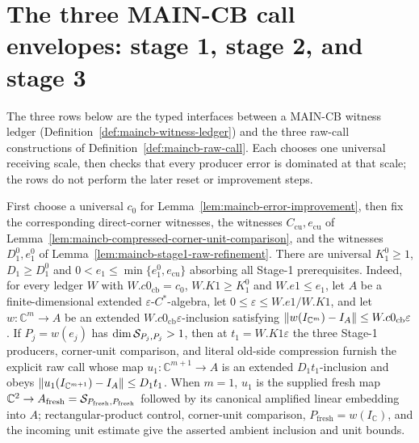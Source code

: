 \section{The three MAIN-CB call envelopes: stage 1, stage 2, and stage 3}\label{sec:maincb-call-envelopes}

The three rows below are the typed interfaces between a MAIN-CB witness ledger
(Definition~\ref{def:maincb-witness-ledger}) and the three raw-call constructions of
Definition~\ref{def:maincb-raw-call}.  Each chooses one universal receiving scale, then
checks that every producer error is dominated at that scale; the rows do not perform the
later reset or improvement steps.

\begin{lemma}\label{lem:maincb-stage1-call-envelope}
First choose a universal $c_{0}$ for Lemma~\ref{lem:maincb-error-improvement}, then fix the
corresponding direct-corner witnesses, the witnesses
$C_{\mathrm{cu}},e_{\mathrm{cu}}$ of
Lemma~\ref{lem:maincb-compressed-corner-unit-comparison}, and the witnesses
$D_{1}^{0},e_{1}^{0}$ of Lemma~\ref{lem:maincb-stage1-raw-refinement}.  There are universal
$K_{1}^{0}\ge1$, $D_{1}\ge D_{1}^{0}$ and
$0<e_{1}\le\min\{e_{1}^{0},e_{\mathrm{cu}}\}$ absorbing all Stage-1 prerequisites.
Indeed, for every ledger $W$ with $W.c0_{\mathrm{cb}}=c_{0}$, $W.K1\ge K_{1}^{0}$ and
$W.e1\le e_{1}$, let $A$ be a finite-dimensional extended
$\varepsilon$-$C^{*}$-algebra, let $0\le\varepsilon\le W.e1/W.K1$, and let
$w:\mathbb C^{m}\to A$ be an extended $W.c0_{\mathrm{cb}}\varepsilon$-inclusion satisfying
$\lVert w(I_{\mathbb C^{m}})-I_A\rVert\le W.c0_{\mathrm{cb}}\varepsilon$.  If
$P_j=w(e_j)$ has $\dim\mathcal S_{P_j,P_j}>1$, then at
$t_{1}=W.K1\varepsilon$ the three Stage-1 producers, corner-unit comparison, and literal
old-side compression furnish the explicit raw call whose map
$u_{1}:\mathbb C^{m+1}\to A$ is an extended $D_{1}t_{1}$-inclusion and obeys
$\lVert u_{1}(I_{\mathbb C^{m+1}})-I_A\rVert\le D_{1}t_{1}$.
When $m=1$, $u_{1}$ is the supplied fresh map
$\mathbb C^{2}\to A_{\mathrm{fresh}}=\mathcal S_{P_{\mathrm{fresh}},P_{\mathrm{fresh}}}$ followed
by its canonical amplified linear embedding into $A$; rectangular-product control,
corner-unit comparison, $P_{\mathrm{fresh}}=w(I_{\mathbb C})$, and the incoming unit
estimate give the asserted ambient inclusion and unit bounds.
\end{lemma}

